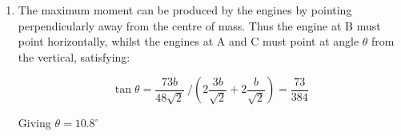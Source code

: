 \begin{problem}
{\begin{enumerate}
	\begin{equation} M D = 3 m D = m \left(  \frac{3b}{\sqrt2} +  \frac{25b}{16\sqrt{2}} \right) \end{equation}
	
	\begin{equation}\Rightarrow D = \frac{1}{3} \left( \frac{73 b}{16\sqrt{2}} \right) = \frac{73b}{48\sqrt{2}} \end{equation}
	
	\item
	
	The maximum moment can be produced by the engines by pointing perpendicularly away from the centre of mass. Thus the engine at B must point horizontally, whilst the engines at A and C must point at angle $\theta$ from the vertical, satisfying:
	
	\begin{equation} \tan{\theta} = \frac{73b}{48\sqrt{2}}~ \Big/ \left(2 \frac{3b}{\sqrt{2}} + 2 \frac{b}{\sqrt{2}}  \right) = \frac{73}{384} \end{equation}
	
	Giving $\theta = 10.8^{\circ}$
	
	
	


\end{enumerate}
}
\end{problem}